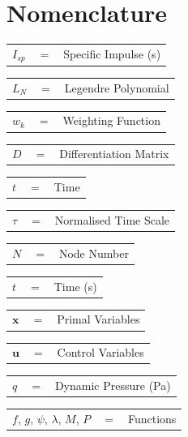 \documentclass[]{aiaa-tc}
\begin{document}
\section*{Nomenclature}
\noindent
\begin{tabular}{p{1.2cm}p{1cm}p{5cm}}
	 $I_{sp}$ & $=$ & Specific Impulse (s)\\ 
	\end{tabular} 
	\begin{tabular}{p{1.2cm}p{1cm}p{5cm}}
	  $L_N$ & $=$ & Legendre Polynomial\\ 
	  	\end{tabular} 
	  	\begin{tabular}{p{1.2cm}p{1cm}p{5cm}}
	  $w_k$& $=$& Weighting Function \\
	  	\end{tabular} 
	  	\begin{tabular}{p{1.2cm}p{1cm}p{5cm}}
	  $D$& $=$ & Differentiation Matrix \\
	  	\end{tabular} 
	  	\begin{tabular}{p{1.2cm}p{1cm}p{5cm}}
	  $t$ & $=$ & Time\\
	  	\end{tabular} 
	  	\begin{tabular}{p{1.2cm}p{1cm}p{5cm}}
	  $\tau$& $=$ & Normalised Time Scale \\
	  	\end{tabular} 
	  	\begin{tabular}{p{1.2cm}p{1cm}p{5cm}}
	  $N$ & $=$ & Node Number \\
	  	\end{tabular} 
	  	\begin{tabular}{p{1.2cm}p{1cm}p{5cm}}
	  $t$ & $=$ & Time (s)\\
	  	\end{tabular} 
	  	\begin{tabular}{p{1.2cm}p{1cm}p{5cm}}
	  $\textbf{x}$& $=$ & Primal Variables\\
	  	\end{tabular} 
	  	\begin{tabular}{p{1.2cm}p{1cm}p{5cm}}
	  $\textbf{u}$& $=$ & Control Variables\\
	  	\end{tabular} 
	  	\begin{tabular}{p{1.2cm}p{1cm}p{5cm}}
	  $q$ & $=$ & Dynamic Pressure (Pa)\\
	  	\end{tabular} 
	  	\begin{tabular}{p{1.2cm}p{1cm}p{5cm}}
	  $f$, $g$, $\psi$, $\lambda$, $M$, $P$ & $=$ & Functions\\
	  	\end{tabular} 
\end{document}
